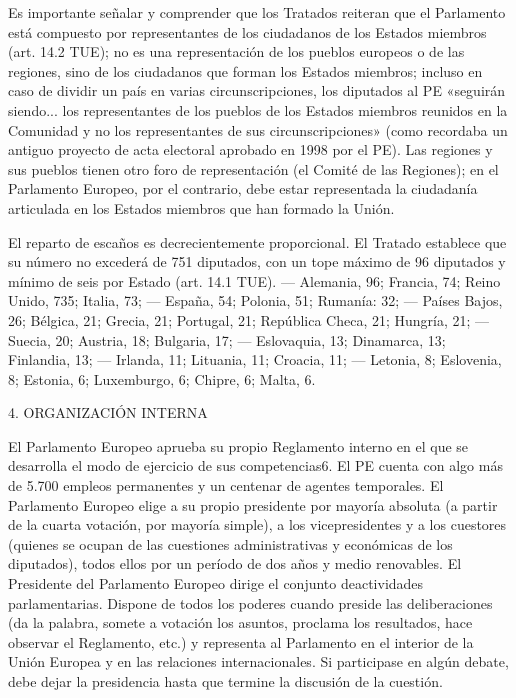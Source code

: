 \documentclass[10pt,a4paper]{article}
\begin{document}
Es importante señalar y comprender que los Tratados reiteran que el Parlamento está compuesto por representantes de los ciudadanos de los Estados miembros (art. 14.2 TUE); no es una representación de los pueblos europeos o de las regiones, sino de los ciudadanos que forman los Estados miembros; incluso en caso de dividir un país en varias circunscripciones, los diputados al PE «seguirán siendo... los representantes de los pueblos de los Estados miembros reunidos en la Comunidad y no los representantes de sus circunscripciones» (como recordaba un antiguo proyecto de acta electoral aprobado en 1998 por el PE). Las regiones y sus pueblos tienen otro foro de representación (el Comité de las Regiones); en el Parlamento Europeo, por el contrario, debe estar representada la ciudadanía articulada en los Estados miembros que han formado la Unión.

El reparto de escaños es decrecientemente proporcional. El Tratado establece que su número no excederá de 751 diputados, con un tope máximo de 96 diputados y mínimo de seis por Estado (art. 14.1 TUE).
— Alemania, 96; Francia, 74; Reino Unido, 735; Italia, 73;
— España, 54; Polonia, 51; Rumanía: 32;
— Países Bajos, 26; Bélgica, 21; Grecia, 21; Portugal, 21; República Checa, 21; Hungría, 21;
— Suecia, 20; Austria, 18; Bulgaria, 17;
— Eslovaquia, 13; Dinamarca, 13; Finlandia, 13;
— Irlanda, 11; Lituania, 11; Croacia, 11;
— Letonia, 8; Eslovenia, 8; Estonia, 6; Luxemburgo, 6; Chipre, 6; Malta, 6.

4. ORGANIZACIÓN INTERNA

El Parlamento Europeo aprueba su propio Reglamento interno en el que se desarrolla el modo de ejercicio de sus competencias6. El PE cuenta con algo más de 5.700 empleos permanentes y un centenar de agentes temporales. El Parlamento Europeo elige a su propio presidente por mayoría absoluta (a partir de la cuarta votación, por mayoría simple), a los vicepresidentes y a los cuestores (quienes se ocupan de las cuestiones administrativas y económicas de los diputados), todos ellos por un período de dos años y medio renovables. El Presidente del Parlamento Europeo dirige el conjunto deactividades parlamentarias. Dispone de todos los poderes cuando preside las deliberaciones (da la palabra, somete a votación los asuntos, proclama los resultados, hace observar el Reglamento, etc.) y representa al Parlamento en el interior de la Unión Europea y en las relaciones internacionales. Si participase en algún debate, debe dejar la presidencia hasta que termine la discusión de la cuestión.
\end{document}
